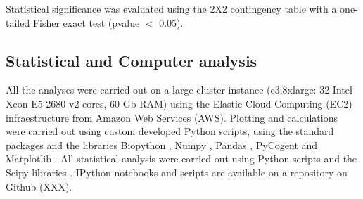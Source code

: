 \begin{center}
\end{center}

Statistical significance was evaluated using the 2X2 contingency table with a one-tailed Fisher exact test (pvalue $<$ 0.05).


\subsection{Statistical and Computer analysis}

All the analyses were carried out on a large cluster instance (c3.8xlarge: 32 Intel Xeon E5-2680 v2 cores, 60 Gb RAM) using the Elastic Cloud Computing (EC2) infraestructure from Amazon Web Services (AWS). Plotting and calculations were carried out using custom developed Python scripts, using the standard packages and the libraries Biopython \cite{Cock:2009hj}, Numpy \cite{Oliphant:2007ud} , Pandas \cite{mckinney-proc-scipy-2010}, PyCogent \cite{Knight:2007gp} and Matplotlib \cite{Hunter:2007ih}. All statistical analysis were carried out using Python scripts and the Scipy libraries \cite{Oliphant:2007ud}. IPython notebooks \cite{Perez:2007wf} and scripts are available on a repository on Github (XXX).


